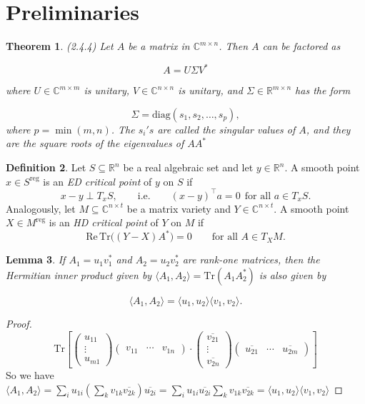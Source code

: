 \documentclass[11pt]{amsart}
\theoremstyle{plain}
\newtheorem{theorem}{Theorem}
\newtheorem{lemma}[theorem]{Lemma}
\theoremstyle{definition}
\newtheorem{definition}[theorem]{Definition}
\theoremstyle{remark}
\begin{document}
\section{Preliminaries} 

\begin{theorem} \cite{golub2013matrix}(2.4.4)
    Let $ A $ be a matrix in $ \mathbb{C}^{m \times n} $. Then $ A $ can be factored as

$$
A = U \Sigma V^*
$$

where $ U \in \mathbb{C}^{m \times m} $ is unitary, $ V \in \mathbb{C}^{n \times n} $ is unitary, and $ \Sigma \in \mathbb{R}^{m \times n} $ has the form

$$\Sigma = \mathrm{diag}(s_1, s_2, \dots, s_p),
$$
where $ p = \min(m, n) $. The $s_i's$ are called the singular values of $A$, and they are the square roots of the eigenvalues of $AA^*$
\end{theorem}
\begin{definition}
Let $S \subseteq \mathbb{R}^n$ be a real algebraic set and let $y \in \mathbb{R}^n$.
A smooth point $x \in S^{\mathrm{reg}}$ is an \emph{ED critical point} of $y$ on $S$ if
\[
x-y \perp T_x S,
\qquad\text{i.e.}\qquad (x-y)^{\top}a = 0 \ \ \text{for all } a \in T_xS.
\]
Analogously, let $M \subseteq \mathbb{C}^{n\times t}$ be a matrix variety and $Y \in \mathbb{C}^{n\times t}$.
A smooth point $X \in M^{\mathrm{reg}}$ is an \emph{HD critical point} of $Y$ on $M$ if
\[
\mathrm{Re}\,\mathrm{Tr}\!\big((Y-X)A^{*}\big)=0
\qquad\text{for all } A \in T_XM.
\]
\end{definition}

 
\begin{lemma}\label{a}
   If $A_1 = u_1 v_1^*$ and $A_2 = u_2 v_2^*$ are rank-one matrices, then the Hermitian inner product given by $\langle A_1, A_2 \rangle = \mathrm{Tr}(A_1 A_2^*)$ is also given by

$$
\langle A_1, A_2 \rangle = \langle u_1, u_2 \rangle \langle v_1, v_2 \rangle.
$$\end{lemma}
\begin{proof}
  $$  \mathrm{Tr}\left[
\begin{pmatrix}
u_{11} \\
\vdots \\
u_{m1}
\end{pmatrix}
\begin{pmatrix}
v_{11} & \cdots & v_{1n}
\end{pmatrix}
\cdot
\begin{pmatrix}
\overline{v_{21}} \\
\vdots \\
\overline{v_{2n}}
\end{pmatrix}
\begin{pmatrix}
\overline{u_{21}} & \cdots & \overline{u_{2m}}
\end{pmatrix}
\right]$$ 
So we have $\langle A_1, A_2 \rangle =\sum_{i} u_{1i} \left( \sum_{k} v_{1k} \overline{v_{2k}} \right) \overline{u_{2i}} = \sum_{i} u_{1i} \overline{u_{2i}} \sum_{k} v_{1k} \overline{v_{2k}} = \langle u_{1}, u_{2} \rangle \langle v_{1}, v_{2} \rangle
$
\end{proof} 
\end{document}
